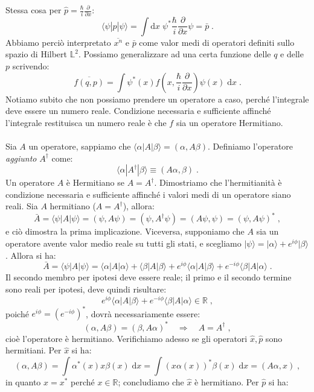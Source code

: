 \documentclass[12pt,a4paper]{report}
\theoremstyle{definition}
\numberwithin{equation}{section}
\newcommand{\diff}[1][]{\mathrm{d}#1}
\newcommand{\bra}{\langle}
\newcommand{\ket}{\rangle}
\begin{document}
Stessa cosa per $\hat{p}=\frac{\hbar}{i}\frac{\partial}{\partial x}$:
$$
\bra\psi|\hat{p}|\psi\ket=\int\diff{x}\; \psi^*\frac{\hbar}{i}\frac{\partial}{\partial x}\psi=\bar{p}\;.
$$
Abbiamo perciò interpretato $\overline{x^n}$ e $\bar{p}$ come valor medi di operatori definiti sullo spazio di Hilbert $\mathbb{L}^2$. Possiamo generalizzare ad una certa funzione delle $q$ e delle $p$ scrivendo:
\begin{equation}
\overline{f(q,p)}=\int \psi^*(x)f\left(x,\frac{\hbar}{i}\frac{\partial}{\partial x}\right)\psi(x)\;\diff{x}\;.
\end{equation}
Notiamo subito che non possiamo prendere un operatore a caso, perché l'integrale deve essere un numero reale. Condizione necessaria e sufficiente affinché l'integrale restituisca un numero reale è che $f$ sia un operatore Hermitiano. \\
\\
Sia $A$ un operatore, sappiamo che $\bra\alpha|A|\beta\ket=(\alpha,A\beta)$. Definiamo l'operatore \textit{aggiunto} $A^{\dagger}$ come:
\begin{equation}
\bra\alpha|A^{\dagger}|\beta\ket \equiv (A\alpha,\beta)\;.
\end{equation}
Un operatore $A$ è Hermitiano se $A=A^{\dagger}$. Dimostriamo che l'hermitianità è condizione necessaria e sufficiente affinché i valori medi di un operatore siano reali. Sia $A$ hermitiano ($A=A^{\dagger}$), allora:
$$
\bar{A}=\bra\psi|A|\psi\ket=(\psi,A\psi)=(\psi,A^{\dagger}\psi)=(A\psi,\psi)=(\psi,A\psi)^*\;,
$$
e ciò dimostra la prima implicazione. Viceversa, supponiamo che $A$ sia un operatore avente valor medio reale su tutti gli stati, e scegliamo $|\psi\ket=|\alpha\ket+e^{i\phi}|\beta\ket$. Allora si ha:
$$
\bar{A}=\bra\psi|A|\psi\ket=\bra\alpha|A|\alpha\ket+\bra\beta|A|\beta\ket+e^{i\phi}\bra\alpha|A|\beta\ket+e^{-i\phi}\bra\beta|A|\alpha\ket\;.
$$
Il secondo membro per ipotesi deve essere reale; il primo e il secondo termine sono reali per ipotesi, deve quindi risultare:
$$
e^{i\phi}\bra\alpha|A|\beta\ket+e^{-i\phi}\bra\beta|A|\alpha\ket \in \mathbb{R}\;,
$$
poiché $e^{i\phi}=(e^{-i\phi})^*$, dovrà necessariamente essere:
$$
(\alpha,A\beta)=(\beta,A\alpha)^*\quad  \Longrightarrow\quad  A=A^{\dagger}\;,
$$
cioè l'operatore è hermitiano. Verifichiamo adesso se gli operatori $\hat{x},\hat{p}$ sono hermitiani. Per $\hat{x}$ si ha:
$$
(\alpha,A\beta)=\int \alpha^*(x)x\beta(x)\;\diff{x}=\int(x\alpha(x))^*\beta(x)\;\diff{x}=(A\alpha,x)\;,
$$
in quanto $x=x^*$ perché $x\in\mathbb{R}$; concludiamo che $\hat{x}$ è hermitiano. Per $\hat{p}$ si ha:
\end{document}
